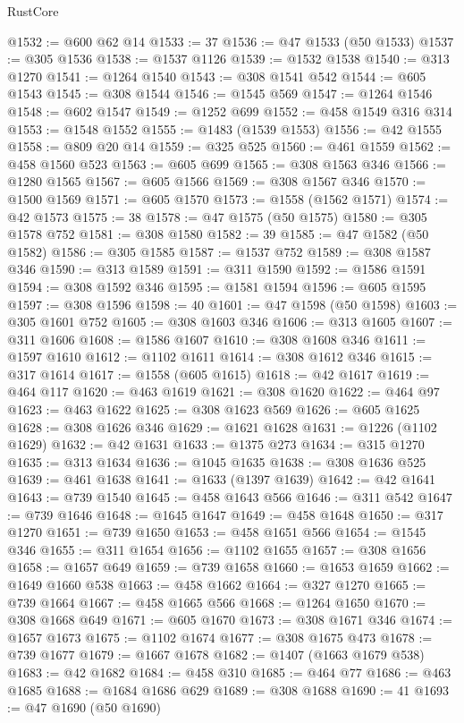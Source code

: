 \begin{lexlean}{RustCore}
\begin{coremodule}
@1532 := @600 @62 @14
@1533 := 37
@1536 := @47 @1533 (@50 @1533)
@1537 := @305 @1536
@1538 := @1537 @1126
@1539 := @1532 @1538
@1540 := @313 @1270
@1541 := @1264 @1540
@1543 := @308 @1541 @542
@1544 := @605 @1543
@1545 := @308 @1544
@1546 := @1545 @569
@1547 := @1264 @1546
@1548 := @602 @1547
@1549 := @1252 @699
@1552 := @458 @1549 @316 @314
@1553 := @1548 @1552
@1555 := @1483 (@1539 @1553)
@1556 := @42 @1555
@1558 := @809 @20 @14
@1559 := @325 @525
@1560 := @461 @1559
@1562 := @458 @1560 @523
@1563 := @605 @699
@1565 := @308 @1563 @346
@1566 := @1280 @1565
@1567 := @605 @1566
@1569 := @308 @1567 @346
@1570 := @1500 @1569
@1571 := @605 @1570
@1573 := @1558 (@1562 @1571)
@1574 := @42 @1573
@1575 := 38
@1578 := @47 @1575 (@50 @1575)
@1580 := @305 @1578 @752
@1581 := @308 @1580
@1582 := 39
@1585 := @47 @1582 (@50 @1582)
@1586 := @305 @1585
@1587 := @1537 @752
@1589 := @308 @1587 @346
@1590 := @313 @1589
@1591 := @311 @1590
@1592 := @1586 @1591
@1594 := @308 @1592 @346
@1595 := @1581 @1594
@1596 := @605 @1595
@1597 := @308 @1596
@1598 := 40
@1601 := @47 @1598 (@50 @1598)
@1603 := @305 @1601 @752
@1605 := @308 @1603 @346
@1606 := @313 @1605
@1607 := @311 @1606
@1608 := @1586 @1607
@1610 := @308 @1608 @346
@1611 := @1597 @1610
@1612 := @1102 @1611
@1614 := @308 @1612 @346
@1615 := @317 @1614
@1617 := @1558 (@605 @1615)
@1618 := @42 @1617
@1619 := @464 @117
@1620 := @463 @1619
@1621 := @308 @1620
@1622 := @464 @97
@1623 := @463 @1622
@1625 := @308 @1623 @569
@1626 := @605 @1625
@1628 := @308 @1626 @346
@1629 := @1621 @1628
@1631 := @1226 (@1102 @1629)
@1632 := @42 @1631
@1633 := @1375 @273
@1634 := @315 @1270
@1635 := @313 @1634
@1636 := @1045 @1635
@1638 := @308 @1636 @525
@1639 := @461 @1638
@1641 := @1633 (@1397 @1639)
@1642 := @42 @1641
@1643 := @739 @1540
@1645 := @458 @1643 @566
@1646 := @311 @542
@1647 := @739 @1646
@1648 := @1645 @1647
@1649 := @458 @1648
@1650 := @317 @1270
@1651 := @739 @1650
@1653 := @458 @1651 @566
@1654 := @1545 @346
@1655 := @311 @1654
@1656 := @1102 @1655
@1657 := @308 @1656
@1658 := @1657 @649
@1659 := @739 @1658
@1660 := @1653 @1659
@1662 := @1649 @1660 @538
@1663 := @458 @1662
@1664 := @327 @1270
@1665 := @739 @1664
@1667 := @458 @1665 @566
@1668 := @1264 @1650
@1670 := @308 @1668 @649
@1671 := @605 @1670
@1673 := @308 @1671 @346
@1674 := @1657 @1673
@1675 := @1102 @1674
@1677 := @308 @1675 @473
@1678 := @739 @1677
@1679 := @1667 @1678
@1682 := @1407 (@1663 @1679 @538)
@1683 := @42 @1682
@1684 := @458 @310
@1685 := @464 @77
@1686 := @463 @1685
@1688 := @1684 @1686 @629
@1689 := @308 @1688
@1690 := 41
@1693 := @47 @1690 (@50 @1690)

\end{coremodule}
\end{lexlean}
